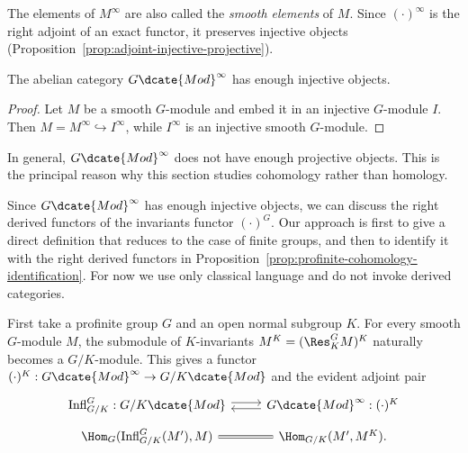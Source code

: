 The elements of $M^\infty$ are also called the \emph{smooth elements} of
$M$. Since $(\cdot)^\infty$ is the right adjoint of an exact functor, it
preserves injective objects
(Proposition~\ref{prop:adjoint-injective-projective}).

\begin{corollary}
	The abelian category $G\dcate{Mod}^\infty$ has enough injective objects.
\end{corollary}
\begin{proof}
	Let $M$ be a smooth $G$-module and embed it in an injective $G$-module
	$I$. Then $M=M^\infty\hookrightarrow I^\infty$, while $I^\infty$ is an
	injective smooth $G$-module.
\end{proof}

\begin{remark}
	In general, $G\dcate{Mod}^\infty$ does not have enough projective objects.
	This is the principal reason why this section studies cohomology rather
	than homology.
\end{remark}

Since $G\dcate{Mod}^\infty$ has enough injective objects, we can discuss the
right derived functors of the invariants functor $(\cdot)^G$. Our approach is
first to give a direct definition that reduces to the case of finite groups,
and then to identify it with the right derived functors in
Proposition~\ref{prop:profinite-cohomology-identification}. For now we use
only classical language and do not invoke derived categories.

First take a profinite group $G$ and an open normal subgroup $K$. For every
smooth $G$-module $M$, the submodule of $K$-invariants
$M^K=(\Res^G_KM)^K$ naturally becomes a $G/K$-module. This gives a functor
$(\cdot)^K:G\dcate{Mod}^\infty\to G/K\dcate{Mod}$ and the evident adjoint
pair
\begin{equation}\label{eqn:invariant-adjunction-profinite}
	\begin{tikzcd}[row sep=tiny]
		\mathrm{Infl}^G_{G/K}:G/K\dcate{Mod} \arrow[shift left,r] &
		G\dcate{Mod}^\infty:(\cdot)^K \arrow[shift left,l]\\
		\Hom_G(\mathrm{Infl}^G_{G/K}(M'),M) \arrow[equal,r] &
		\Hom_{G/K}(M',M^K).
	\end{tikzcd}
\end{equation}

